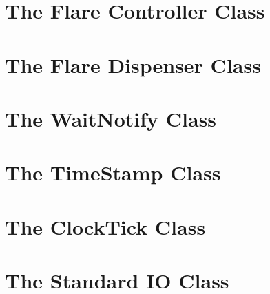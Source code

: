 \documentclass[\pformat,12pt]{article}
\begin{document}
\section{The Flare Controller Class}



\section{The Flare Dispenser Class}



\section{The WaitNotify Class}



\section{The TimeStamp Class}



\section{The ClockTick Class}



\section{The Standard IO Class}



\printindex
{}
\end{document}
